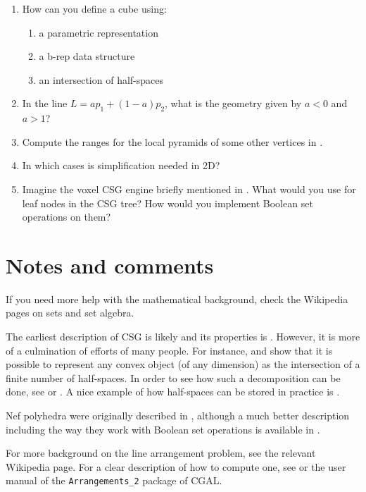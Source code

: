 \begin{enumerate}
	\item How can you define a cube using:
	\begin{enumerate}
		\item a parametric representation
		\item a b-rep data structure
		\item an intersection of half-spaces
	\end{enumerate}
	\item In the line \(L = a p_1 + (1-a) p_2 \), what is the geometry given by \(a < 0\) and \(a > 1\)?
	\item Compute the ranges for the local pyramids of some other vertices in 
	.
	\item In which cases is simplification needed in 2D\@?
	\item Imagine the voxel CSG engine briefly mentioned in . What would you use for leaf nodes in the CSG tree? How would you implement Boolean set operations on them?
\end{enumerate}



%
\section{Notes and comments}

If you need more help with the mathematical background, check the Wikipedia pages on sets and set algebra.

The earliest description of CSG is likely \citet[\S{}12.3]{Requicha77} and its properties is \citet{Requicha78}.
However, it is more of a culmination of efforts of many people.
For instance, \citet{Shamos76} and \citet{Preparata79} show that it is possible to represent any convex object (of any dimension) as the intersection of a finite number of half-spaces.
In order to see how such a decomposition can be done, see \citet{Chazelle79} or \citet{Bajaj90}.
A nice example of how half-spaces can be stored in practice is \citet{Naylor90}.

Nef polyhedra were originally described in \citet{Nef78}, although a much better description including the way they work with Boolean set operations is available in \citet{Bieri88}.

For more background on the line arrangement problem, see the relevant Wikipedia page.
For a clear description of how to compute one, see \citet[\S{}2]{deBerg08} or the user manual of the \texttt{Arrangements\_2} package of CGAL.


